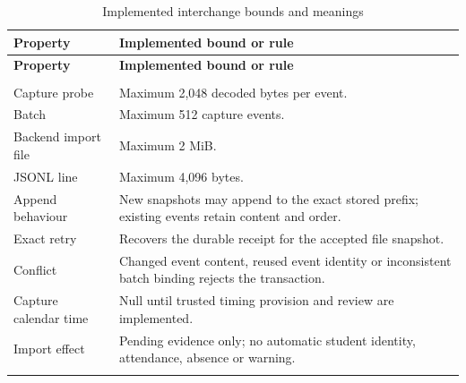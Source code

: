 \begingroup
\singlespacing%
\setlength{\tabcolsep}{4pt}
\begin{longtable}{@{}>{\RaggedRight\arraybackslash}p{}>{\RaggedRight\arraybackslash}p{}@{}}
\caption{Implemented interchange bounds and meanings}\label{tab:3-7}\\
\toprule
\textbf{Property} & \textbf{Implemented bound or rule} \\
\midrule
\endfirsthead%
\toprule
\textbf{Property} & \textbf{Implemented bound or rule} \\
\midrule
\endhead%
\midrule
\multicolumn{2}{r}{Continued on next page}\\
\endfoot%
\bottomrule
\endlastfoot%
Capture probe & Maximum 2,048 decoded bytes per event. \\ \addlinespace
Batch & Maximum 512 capture events. \\ \addlinespace
Backend import file & Maximum 2 MiB. \\ \addlinespace
JSONL line & Maximum 4,096 bytes. \\ \addlinespace
Append behaviour & New snapshots may append to the exact stored prefix; existing events retain content and order. \\ \addlinespace
Exact retry & Recovers the durable receipt for the accepted file snapshot. \\ \addlinespace
Conflict & Changed event content, reused event identity or inconsistent batch binding rejects the transaction. \\ \addlinespace
Capture calendar time & Null until trusted timing provision and review are implemented. \\ \addlinespace
Import effect & Pending evidence only; no automatic student identity, attendance, absence or warning. \\ \addlinespace
\end{longtable}
\endgroup
